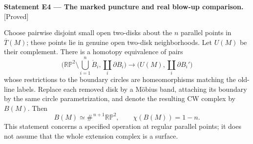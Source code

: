 \documentclass[11pt,a4paper]{article}
\newenvironment{resultenv}[3]{\par\medskip\phantomsection\label{#1}\noindent\textbf{Statement #1 --- #3.}\quad\textsf{[#2]}\par\smallskip\noindent\ignorespaces}{\par\medskip}
\begin{document}
\begin{resultenv}{E4}{Proved}{The marked puncture and real blow-up comparison}
Choose pairwise disjoint small open two-disks about the $n$ parallel points
in $\overline T(M)$; these points lie in genuine open two-disk neighborhoods.
Let $U(M)$ be their complement. There is a homotopy equivalence of pairs
\[
 \bigl(\mathbb {RP}^2\setminus\textstyle\bigcup_{i=1}^n\mathring B_i,
       \coprod_i\partial B_i\bigr)
 \longrightarrow
 \bigl(U(M),\coprod_i\partial B_i'\bigr)
\]
whose restrictions to the boundary circles are homeomorphisms matching the
old-line labels. Replace each removed disk by a M\"obius band, attaching its
boundary by the same circle parametrization, and denote the resulting CW
complex by $B(M)$. Then
\[
 B(M)\simeq\#^{\,n+1}\mathbb {RP}^2,
 \qquad\chi(B(M))=1-n.
\]
This statement concerns a specified operation at regular parallel points;
it does not assume that the whole extension complex is a surface.
\end{resultenv}
\end{document}

